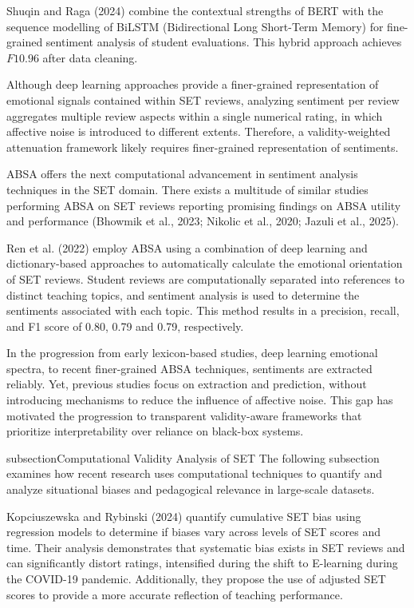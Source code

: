 Shuqin and Raga (2024) combine the contextual strengths of BERT with the sequence modelling of BiLSTM (Bidirectional Long Short-Term Memory) for fine-grained sentiment analysis of student evaluations. This hybrid approach achieves $F1  0.96$ after data cleaning. 

Although deep learning approaches provide a finer-grained representation of emotional signals contained within SET reviews, analyzing sentiment per review aggregates multiple review aspects within a single numerical rating, in which affective noise is introduced to different extents. Therefore, a validity-weighted attenuation framework likely requires finer-grained representation of sentiments. 

ABSA offers the next computational advancement in sentiment analysis techniques in the SET domain. There exists a multitude of similar studies performing ABSA on SET reviews reporting promising findings on ABSA utility and performance (Bhowmik et al., 2023; Nikolic et al., 2020; Jazuli et al., 2025).

Ren et al. (2022) employ ABSA using a combination of deep learning and dictionary-based approaches to automatically calculate the emotional orientation of SET reviews. Student reviews are computationally separated into references to distinct teaching topics, and sentiment analysis is used to determine the sentiments associated with each topic. This method results in a precision, recall, and F1 score of 0.80, 0.79 and 0.79, respectively.

In the progression from early lexicon-based studies, deep learning emotional spectra, to recent finer-grained ABSA techniques, sentiments are extracted reliably. Yet, previous studies focus on extraction and prediction, without introducing mechanisms to reduce the influence of affective noise. This gap has motivated the progression to transparent validity-aware frameworks that prioritize interpretability over reliance on black-box systems.

subsection{Computational Validity Analysis of SET}
The following subsection examines how recent research uses computational techniques to quantify and analyze situational biases and pedagogical relevance in large-scale datasets.

Kopciuszewska and Rybinski (2024) quantify cumulative SET bias using regression models to determine if biases vary across levels of SET scores and time. Their analysis demonstrates that systematic bias exists in SET reviews and can significantly distort ratings, intensified during the shift to E-learning during the COVID-19 pandemic. Additionally, they propose the use of adjusted SET scores to provide a more accurate reflection of teaching performance. 

